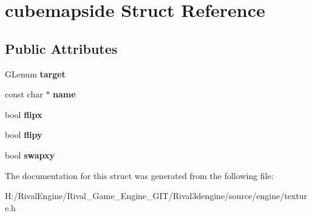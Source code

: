 \hypertarget{structcubemapside}{}\section{cubemapside Struct Reference}
\label{structcubemapside}
\subsection*{Public Attributes}
\begin{DoxyCompactItemize}
\item 
\mbox{\label{structcubemapside_a09dd5d5bf09b6a585248a65f766ab304}} 
G\+Lenum {\bfseries target}
\item 
\mbox{\label{structcubemapside_a96675f8f5a73627b3eac591b9efd1379}} 
const char $\ast$ {\bfseries name}
\item 
\mbox{\label{structcubemapside_a2775d224ad79cadb7f05e92be66e18d8}} 
bool {\bfseries flipx}
\item 
\mbox{\label{structcubemapside_ad40e1cae16eaa4856fad3d282d051f9d}} 
bool {\bfseries flipy}
\item 
\mbox{\label{structcubemapside_a3078f25f9eb10b373ea4953efb1d06e4}} 
bool {\bfseries swapxy}
\end{DoxyCompactItemize}


The documentation for this struct was generated from the following file\+:\begin{DoxyCompactItemize}
\item 
H\+:/\+Rival\+Engine/\+Rival\+\_\+\+Game\+\_\+\+Engine\+\_\+\+G\+I\+T/\+Rival3dengine/source/engine/texture.\+h\end{DoxyCompactItemize}
